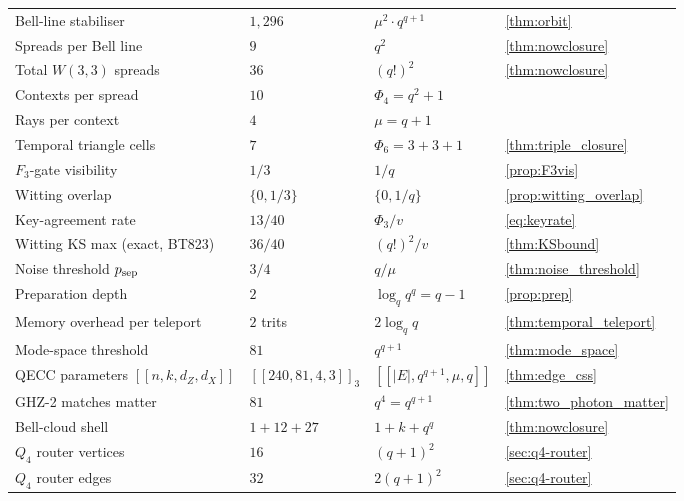 ﻿\documentclass[12pt]{article}
\begin{document}
\begin{center}
\begin{tabular}{l l l l}
Bell-line stabiliser              & $1{,}296$ & $\mu^2 \cdot q^{q+1}$     & \cref{thm:orbit} \\
Spreads per Bell line             & $9$       & $q^2$                     & \cref{thm:nowclosure} \\
Total $W(3,3)$ spreads            & $36$      & $(q!)^2$                  & \cref{thm:nowclosure} \\
Contexts per spread               & $10$      & $\Phi_4 = q^2+1$          & \\
Rays per context                  & $4$       & $\mu = q+1$               & \\
Temporal triangle cells           & $7$       & $\Phi_6 = 3+3+1$          & \cref{thm:triple_closure} \\
$F_3$-gate visibility             & $1/3$     & $1/q$                     & \cref{prop:F3vis} \\
Witting overlap                   & $\{0,1/3\}$ & $\{0,1/q\}$             & \cref{prop:witting_overlap} \\
Key-agreement rate                & $13/40$   & $\Phi_3/v$                & \eqref{eq:keyrate} \\
Witting KS max (exact, BT823)     & $36/40$   & $(q!)^2/v$                & \cref{thm:KSbound} \\
Noise threshold $p_{\rm sep}$     & $3/4$     & $q/\mu$                   & \cref{thm:noise_threshold} \\
Preparation depth                 & $2$       & $\log_q q^q = q-1$        & \cref{prop:prep} \\
Memory overhead per teleport      & $2$ trits & $2\log_q q$               & \cref{thm:temporal_teleport} \\
Mode-space threshold              & $81$      & $q^{q+1}$                 & \cref{thm:mode_space} \\
QECC parameters $[[n,k,d_Z,d_X]]$ & $[[240,81,4,3]]_3$ & $[[|E|,q^{q+1},\mu,q]]$ & \cref{thm:edge_css} \\
GHZ-2 matches matter              & $81$      & $q^4 = q^{q+1}$           & \cref{thm:two_photon_matter} \\
Bell-cloud shell                  & $1+12+27$ & $1+k+q^q$                 & \cref{thm:nowclosure} \\
$Q_4$ router vertices             & $16$      & $(q+1)^2$                 & \cref{sec:q4-router} \\
$Q_4$ router edges                & $32$      & $2(q+1)^2$                & \cref{sec:q4-router} \\

\end{tabular}
\end{center}
\end{document}
